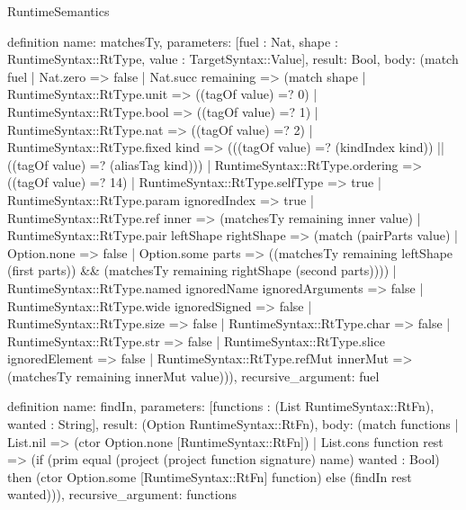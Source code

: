 \begin{lexlean}{RuntimeSemantics}
\begin{semanticmodule}
definition{
  name: matchesTy,
  parameters: [fuel : Nat, shape : RuntimeSyntax::RtType, value : TargetSyntax::Value],
  result: Bool,
  body: (match fuel
    | Nat.zero => false
    | Nat.succ remaining => (match shape
      | RuntimeSyntax::RtType.unit => ((tagOf value) =? 0)
      | RuntimeSyntax::RtType.bool => ((tagOf value) =? 1)
      | RuntimeSyntax::RtType.nat => ((tagOf value) =? 2)
      | RuntimeSyntax::RtType.fixed kind => (((tagOf value) =? (kindIndex kind)) || ((tagOf value) =? (aliasTag kind)))
      | RuntimeSyntax::RtType.ordering => ((tagOf value) =? 14)
      | RuntimeSyntax::RtType.selfType => true
      | RuntimeSyntax::RtType.param ignoredIndex => true
      | RuntimeSyntax::RtType.ref inner => (matchesTy remaining inner value)
      | RuntimeSyntax::RtType.pair leftShape rightShape => (match (pairParts value)
        | Option.none => false
        | Option.some parts => ((matchesTy remaining leftShape (first parts)) && (matchesTy remaining rightShape (second parts))))
      | RuntimeSyntax::RtType.named ignoredName ignoredArguments => false
      | RuntimeSyntax::RtType.wide ignoredSigned => false
      | RuntimeSyntax::RtType.size => false
      | RuntimeSyntax::RtType.char => false
      | RuntimeSyntax::RtType.str => false
      | RuntimeSyntax::RtType.slice ignoredElement => false
      | RuntimeSyntax::RtType.refMut innerMut => (matchesTy remaining innerMut value))),
  recursive_argument: fuel
}

definition{
  name: findIn,
  parameters: [functions : (List RuntimeSyntax::RtFn), wanted : String],
  result: (Option RuntimeSyntax::RtFn),
  body: (match functions
    | List.nil => (ctor Option.none [RuntimeSyntax::RtFn])
    | List.cons function rest => (if (prim equal (project (project function signature) name) wanted : Bool) then (ctor Option.some [RuntimeSyntax::RtFn] function) else (findIn rest wanted))),
  recursive_argument: functions
}


\end{semanticmodule}
\end{lexlean}
